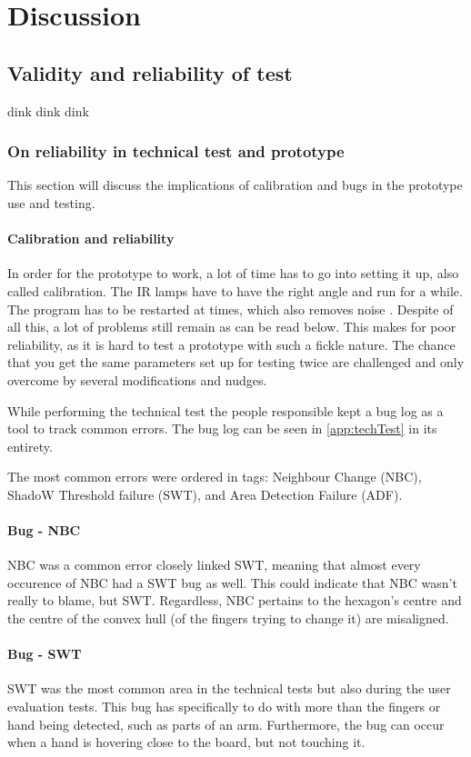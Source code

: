 \chapter{Discussion}\label{ch:discussion}

\section{Validity and reliability of test}
dink dink dink

\subsection{On reliability in technical test and prototype}
This section will discuss the implications of calibration and bugs in the prototype use and testing. 
\subsubsection*{Calibration and reliability}
In order for the prototype to work, a lot of time has to go into setting it up, also called calibration. The IR lamps have to have the right angle and run for a while. The program has to be restarted at times, which also removes noise . Despite of all this, a lot of problems still remain as can be read below. This makes for poor reliability, as it is hard to test a prototype with such a fickle nature. The chance that you get the same parameters set up for testing twice are challenged and only overcome by several modifications and nudges.

While performing the technical test the people responsible kept a bug log as a tool to track common errors. The bug log can be seen in \ref{app:techTest} in its entirety.

The most common errors were ordered in tags: Neighbour Change (NBC), ShadoW Threshold failure (SWT), and Area Detection Failure (ADF). 
\subsubsection*{Bug - NBC} 
NBC was a common error closely linked SWT, meaning that almost every occurence of NBC had a SWT bug as well. This could indicate that NBC wasn't really to blame, but SWT. Regardless, NBC pertains to the hexagon's centre and the centre of the convex hull (of the fingers trying to change it) are misaligned.
\subsubsection*{Bug - SWT} 
SWT was the most common area in the technical tests but also during the user evaluation tests. This bug has specifically to do with more than the fingers or hand being detected, such as parts of an arm. Furthermore, the bug can occur when a hand is hovering close to the board, but not touching it.
